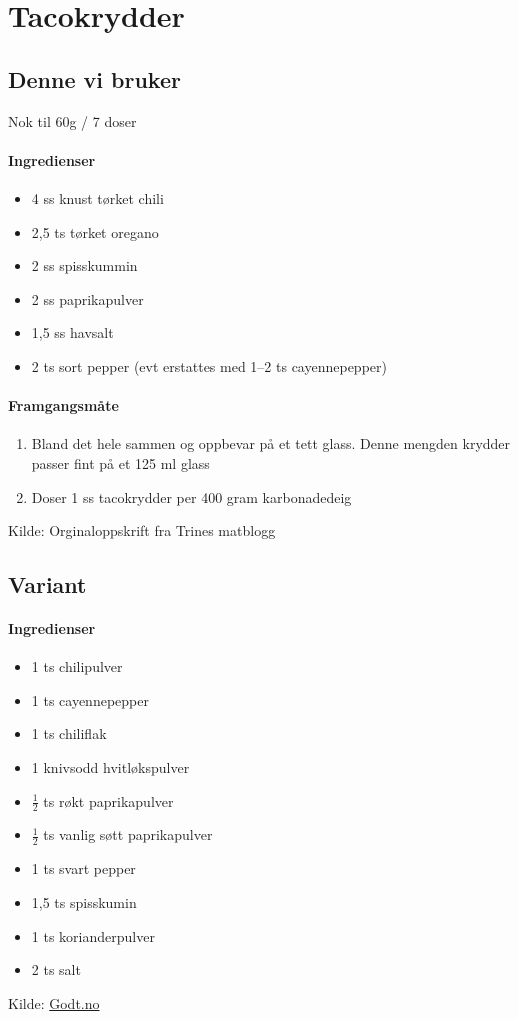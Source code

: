\section{﻿Tacokrydder}
\label{tacokrydder}

\subsection{Denne vi bruker}
Nok til 60g / 7 doser
\paragraph{Ingredienser}
\begin{itemize}[noitemsep]
	\item 4 ss knust tørket chili
	\item 2,5 ts tørket oregano
	\item 2 ss spisskummin
	\item 2 ss paprikapulver
	\item 1,5 ss havsalt
	\item 2 ts sort pepper (evt erstattes med 1--2 ts cayennepepper)
\end{itemize}

\paragraph{Framgangsmåte}
\begin{enumerate}[noitemsep]
	\item Bland det hele sammen og oppbevar på et tett glass. Denne mengden krydder passer fint på et 125 ml glass
	\item Doser 1 ss tacokrydder per 400 gram karbonadedeig
\end{enumerate}

Kilde: Orginaloppskrift fra Trines matblogg

\subsection{Variant}

\paragraph{Ingredienser}
\begin{itemize}[noitemsep]
	\item 1 ts chilipulver
	\item 1 ts cayennepepper
	\item 1 ts chiliflak
	\item 1 knivsodd hvitløkspulver
	\item $\frac{1}{2}$  ts røkt paprikapulver
	\item $\frac{1}{2}$  ts vanlig søtt paprikapulver
	\item 1 ts svart pepper
	\item 1,5 ts spisskumin
	\item 1 ts korianderpulver
	\item 2 ts salt
\end{itemize}


Kilde: \href{http://www.godt.no/#!/artikkel/22127483/slik-lager-du-meksikansk-taco-helt-fra-bunnen-av}{Godt.no}
